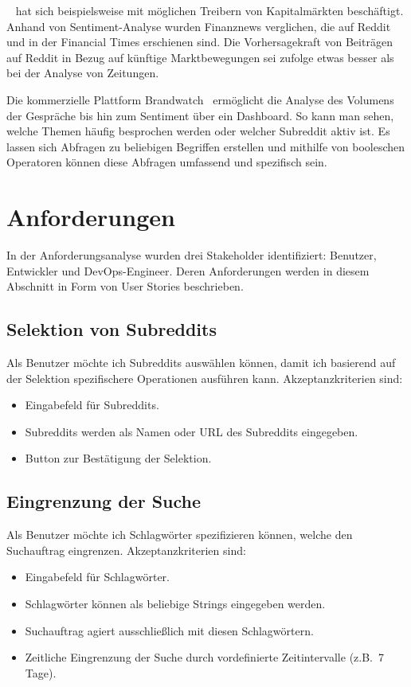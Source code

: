 \documentclass[a4paper, 10pt, conference]{IEEEtran}
\begin{document}
\citeauthor{lubitz2017}~\cite{lubitz2017} hat sich beispielsweise mit möglichen Treibern von Kapitalmärkten beschäftigt. Anhand von Sentiment-Analyse wurden Finanznews verglichen, die auf Reddit und in der Financial Times erschienen sind. Die Vorhersagekraft von Beiträgen auf Reddit in Bezug auf künftige Marktbewegungen sei \citeauthor{lubitz2017} zufolge etwas besser als bei der Analyse von Zeitungen.

Die kommerzielle Plattform Brandwatch~\cite{brandwatch} ermöglicht die Analyse des Volumens der Gespräche bis hin zum Sentiment über ein Dashboard. So kann man sehen, welche Themen häufig besprochen werden oder welcher Subreddit aktiv ist. Es lassen sich Abfragen zu beliebigen Begriffen erstellen und mithilfe von booleschen Operatoren können diese Abfragen umfassend und spezifisch sein.


\section{Anforderungen} \label{s:anforderungen}

In der Anforderungsanalyse wurden drei Stakeholder identifiziert: Benutzer, Entwickler und DevOps-Engineer. Deren Anforderungen werden in diesem Abschnitt in Form von User Stories beschrieben.

\subsection{Selektion von Subreddits}

Als Benutzer möchte ich Subreddits auswählen können, damit ich basierend auf der Selektion spezifischere Operationen ausführen kann. Akzeptanzkriterien sind:
\begin{itemize}
\item Eingabefeld für Subreddits.
\item Subreddits werden als Namen oder URL des Subreddits eingegeben.
\item Button zur Bestätigung der Selektion.
\end{itemize}

\subsection{Eingrenzung der Suche}

Als Benutzer möchte ich Schlagwörter spezifizieren können, welche den Suchauftrag eingrenzen. Akzeptanzkriterien sind:
\begin{itemize}
\item Eingabefeld für Schlagwörter.
\item Schlagwörter können als beliebige Strings eingegeben werden.
\item Suchauftrag agiert ausschließlich mit diesen Schlagwörtern.
\item Zeitliche Eingrenzung der Suche durch vordefinierte Zeitintervalle (z.B.~7 Tage).
\end{itemize}
\end{document}
